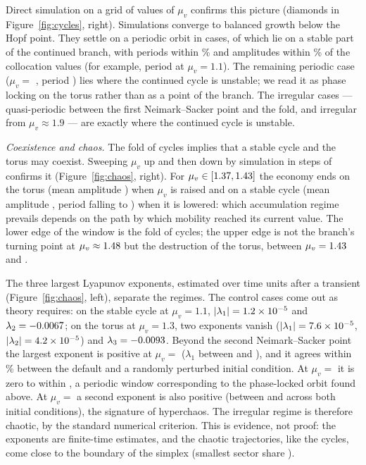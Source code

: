 \documentclass[11pt]{article}
\begin{document}
Direct simulation on a grid of \AccSimNGrid{} values of $\mu_v$ confirms
this picture (diamonds in Figure~\ref{fig:cycles}, right). Simulations
converge to balanced growth below the Hopf point. They settle on a
periodic orbit in \AccSimNPeriodic{} cases, \AccSimNMatched{} of which lie
on a stable part of the continued branch, with periods within
\AccSimPeriodDev\% and amplitudes within \AccSimAmpDev\% of the
collocation values (for example, period \AccSimPeriodOneOne{} at
$\mu_v=1.1$). The remaining periodic case ($\mu_v=$ \AccSimUnmatched,
period \AccSimUnmatchedPeriod) lies where the continued cycle is
unstable; we read it as phase locking on the torus rather than as a
point of the branch. The \AccSimNIrregular{} irregular cases ---
quasi-periodic between the first Neimark--Sacker point and the fold, and
irregular from $\mu_v\approx1.9$ --- are exactly where the continued
cycle is unstable.

\emph{Coexistence and chaos.} The fold of cycles implies that a stable
cycle and the torus may coexist. Sweeping $\mu_v$ up and then down by
simulation in steps of \AccHystStep{} confirms it
(Figure~\ref{fig:chaos}, right). For $\mu_v\in[1.37,1.43]$
the economy ends on the torus (mean amplitude \AccHystTorusAmp) when
$\mu_v$ is raised and on a stable cycle (mean amplitude
\AccHystCycleAmp, period \AccHystCyclePeriodHi{} falling to
\AccHystCyclePeriodLo) when it is lowered: which accumulation regime
prevails depends on the path by which mobility reached its current value.
The lower edge of the window is the fold of cycles; the upper edge is not
the branch's turning point at $\mu_v\approx1.48$ but the
destruction of the torus, between $\mu_v=1.43$ and \AccHystNext.

The three largest Lyapunov exponents, estimated over \AccLyapT{} time
units after a transient (Figure~\ref{fig:chaos}, left), separate the
regimes. The control cases come out as theory requires: on the stable
cycle at $\mu_v=1.1$, $|\lambda_1|=1.2\times10^{-5}$ and
$\lambda_2=-0.0067$; on the torus at $\mu_v=1.3$, two exponents
vanish ($|\lambda_1|=7.6\times10^{-5}$, $|\lambda_2|=4.2\times10^{-5}$)
and $\lambda_3=-0.0093$. Beyond the second Neimark--Sacker
point the largest exponent is positive at $\mu_v=$ \AccLyapChaosList{}
($\lambda_1$ between \AccLyapOneMin{} and \AccLyapOneMax{}), and it
agrees within \AccLyapICDev\% between the default and a randomly
perturbed initial condition. At $\mu_v=$ \AccLyapWindowMuv{} it is zero
to within \AccLyapWindowOne, a periodic window corresponding to the
phase-locked orbit found above. At $\mu_v=$ \AccHyperList{} a second
exponent is also positive (between \AccHyperTwoMin{} and
\AccHyperTwoMax{} across both initial conditions), the signature of
hyperchaos. The irregular regime is therefore chaotic, by the standard
numerical criterion. This is evidence, not proof: the exponents are
finite-time estimates, and the chaotic trajectories, like the cycles, come
close to the boundary of the simplex (smallest sector share
\AccLyapQuotaMin).
\end{document}
